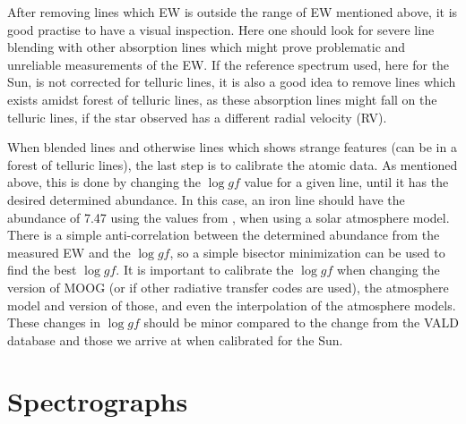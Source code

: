 After removing lines which EW is outside the range of EW mentioned above, it is
good practise to have a visual inspection. Here one should look for severe line
blending with other absorption lines which might prove problematic and
unreliable measurements of the EW. If the reference spectrum used, here for the
Sun, is not corrected for telluric lines, it is also a good idea to remove lines
which exists amidst forest of telluric lines, as these absorption lines might
fall on the telluric lines, if the star observed has a different radial velocity
(RV).

When blended lines and otherwise lines which shows strange features (can be in a
forest of telluric lines), the last step is to calibrate the atomic data. As
mentioned above, this is done by changing the $\log \mathit{gf}$ value for a
given line, until it has the desired determined abundance. In this case, an iron
line should have the abundance of 7.47 using the values from
\citet{Gonzalez2000}, when using a solar atmosphere model. There is a simple
anti-correlation between the determined abundance from the measured EW and the
$\log \mathit{gf}$, so a simple bisector minimization can be used to find the
best $\log \mathit{gf}$. It is important to calibrate the $\log \mathit{gf}$
when changing the version of MOOG (or if other radiative transfer codes are
used), the atmosphere model and version of those, and even the interpolation of
the atmosphere models. These changes in $\log \mathit{gf}$ should be minor
compared to the change from the VALD database and those we arrive at when
calibrated for the Sun.



\section{Spectrographs}
\label{sec:spectrographs}

